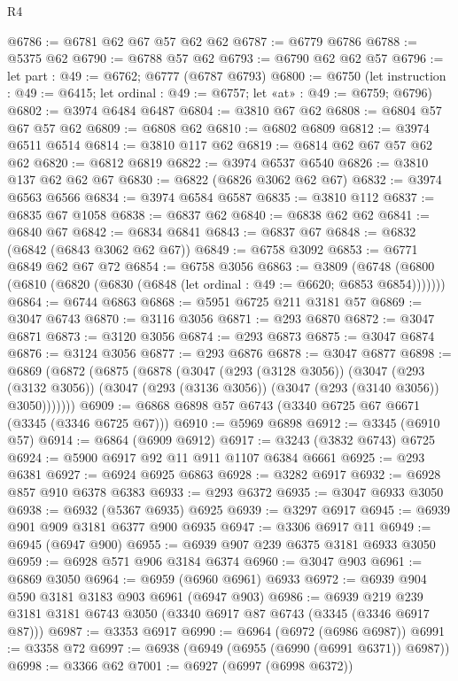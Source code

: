 \begin{lexlean}{R4}
\begin{coremodule}
@6786 := @6781 @62 @67 @57 @62 @62
@6787 := @6779 @6786
@6788 := @5375 @62
@6790 := @6788 @57 @62
@6793 := @6790 @62 @62 @57
@6796 := let part : @49 := @6762; @6777 (@6787 @6793)
@6800 := @6750
    (let instruction : @49 := @6415; let ordinal : @49 := @6757; let «at» : @49 := @6759; @6796)
@6802 := @3974 @6484 @6487
@6804 := @3810 @67 @62
@6808 := @6804 @57 @67 @57 @62
@6809 := @6808 @62
@6810 := @6802 @6809
@6812 := @3974 @6511 @6514
@6814 := @3810 @117 @62
@6819 := @6814 @62 @67 @57 @62 @62
@6820 := @6812 @6819
@6822 := @3974 @6537 @6540
@6826 := @3810 @137 @62 @62 @67
@6830 := @6822 (@6826 @3062 @62 @67)
@6832 := @3974 @6563 @6566
@6834 := @3974 @6584 @6587
@6835 := @3810 @112
@6837 := @6835 @67 @1058
@6838 := @6837 @62
@6840 := @6838 @62 @62
@6841 := @6840 @67
@6842 := @6834 @6841
@6843 := @6837 @67
@6848 := @6832 (@6842 (@6843 @3062 @62 @67))
@6849 := @6758 @3092
@6853 := @6771 @6849 @62 @67 @72
@6854 := @6758 @3056
@6863 := @3809
    (@6748 (@6800 (@6810 (@6820 (@6830 (@6848 (let ordinal : @49 := @6620; @6853 @6854)))))))
@6864 := @6744 @6863
@6868 := @5951 @6725 @211 @3181 @57
@6869 := @3047 @6743
@6870 := @3116 @3056
@6871 := @293 @6870
@6872 := @3047 @6871
@6873 := @3120 @3056
@6874 := @293 @6873
@6875 := @3047 @6874
@6876 := @3124 @3056
@6877 := @293 @6876
@6878 := @3047 @6877
@6898 := @6869
    (@6872
      (@6875
        (@6878
          (@3047
            (@293 (@3128 @3056))
            (@3047
              (@293 (@3132 @3056))
              (@3047 (@293 (@3136 @3056)) (@3047 (@293 (@3140 @3056)) @3050)))))))
@6909 := @6868 @6898 @57 @6743 (@3340 @6725 @67 @6671 (@3345 (@3346 @6725 @67)))
@6910 := @5969 @6898
@6912 := @3345 (@6910 @57)
@6914 := @6864 (@6909 @6912)
@6917 := @3243 (@3832 @6743) @6725
@6924 := @5900 @6917 @92 @11 @911 @1107 @6384 @6661
@6925 := @293 @6381
@6927 := @6924 @6925 @6863
@6928 := @3282 @6917
@6932 := @6928 @857 @910 @6378 @6383
@6933 := @293 @6372
@6935 := @3047 @6933 @3050
@6938 := @6932 (@5367 @6935) @6925
@6939 := @3297 @6917
@6945 := @6939 @901 @909 @3181 @6377 @900 @6935
@6947 := @3306 @6917 @11
@6949 := @6945 (@6947 @900)
@6955 := @6939 @907 @239 @6375 @3181 @6933 @3050
@6959 := @6928 @571 @906 @3184 @6374
@6960 := @3047 @903
@6961 := @6869 @3050
@6964 := @6959 (@6960 @6961) @6933
@6972 := @6939 @904 @590 @3181 @3183 @903 @6961 (@6947 @903)
@6986 := @6939 @219 @239 @3181 @3181 @6743 @3050 (@3340 @6917 @87 @6743 (@3345 (@3346 @6917 @87)))
@6987 := @3353 @6917
@6990 := @6964 (@6972 (@6986 @6987))
@6991 := @3358 @72
@6997 := @6938 (@6949 (@6955 (@6990 (@6991 @6371)) @6987))
@6998 := @3366 @62
@7001 := @6927 (@6997 (@6998 @6372))

\end{coremodule}
\end{lexlean}
